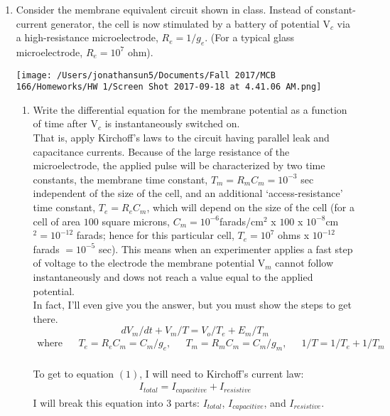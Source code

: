 \documentclass[11pt]{article}
\begin{document}
\begin{enumerate}[label=\arabic*.]
\newpage
\item
Consider the membrane equivalent circuit shown in class. Instead of constant-current generator, the cell is now stimulated by a battery of potential V$_c$ via a high-resistance microelectrode, $R_e = 1 / g_e$. (For a typical glass microelectrode, $R_e = 10^7$ ohm).
\begin{center}
\texttt{[image: /Users/jonathansun5/Documents/Fall 2017/MCB 166/Homeworks/HW 1/Screen Shot 2017-09-18 at 4.41.06 AM.png]}
\end{center}
\begin{enumerate}[label=(\alph*)]
\item
Write the differential equation for the membrane potential as a function of time after V$_c$ is instantaneously switched on.
\vspace*{1\baselineskip}
\\
That is, apply Kirchoff's laws to the circuit having parallel leak and capacitance currents. Because of the large resistance of the microelectrode, the applied pulse will be characterized by two time constants, the membrane time constant, $T_m = R_mC_m = 10^{-3}$ sec independent of the size of the cell, and an additional `access-resistance' time constant, $T_e = R_eC_m$, which will depend on the size of the cell (for a cell of area $100$ square microns, $C_m = 10^{-6}$farads/cm$^2$ x $100$ x $10^{-8}$cm$^2 = 10^{-12}$ farads; hence for this particular cell, $T_e = 10^7$ ohms x $10^{-12}$ farads $= 10^{-5}$ sec). This means when an experimenter applies a fast step of voltage to the electrode the membrane potential V$_m$ cannot follow instantaneously and dows not reach a value equal to the applied potential.
\vspace*{1\baselineskip}
\\
In fact, I'll even give you the answer, but you must show the steps to get there. \\
\begin{equation}
\label{eq:1}
dV_m / dt + V_m / T = V_o / T_e + E_m / T_m
\end{equation}
\begin{align*}
\text{where} && T_e = R_eC_m = C_m / g_e \text{,} && T_m = R_mC_m = C_m / g_m \text{,} && 1/T = 1/T_e + 1/T_m
\end{align*}
\vspace*{1\baselineskip}
\\
To get to equation $(1)$, I will need to Kirchoff's current law:
\begin{align*}
I_{total} = I_{capacitive} + I_{resistive}
\end{align*}
I will break this equation into $3$ parts: $I_{total}$, $I_{capacitive}$, and $I_{resistive}$. \\


\end{enumerate}
\end{enumerate}
\end{document}
